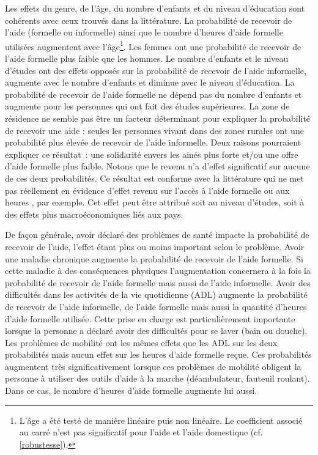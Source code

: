 \begin{Article}
\begin{refsection}[Bonnal]
Les effets du genre, de l'âge, du nombre d'enfants et du niveau d'éducation sont cohérents avec ceux trouvés dans la littérature. La probabilité de recevoir de l'aide (formelle ou informelle) ainsi que le nombre d'heures d'aide formelle utilisées augmentent avec l'âge\footnote{L’âge a été testé de manière linéaire puis non linéaire. Le coefficient associé au carré n’est pas significatif pour l'aide et l'aide domestique (cf. \autoref{robustesse}).}. Les femmes ont une probabilité de recevoir de l'aide formelle plus faible que les hommes. Le nombre d'enfants et le niveau d'études ont des effets opposés sur la probabilité de recevoir de l'aide informelle, augmente avec le nombre d'enfants et diminue avec le niveau d'éducation. La probabilité de recevoir de l'aide formelle ne dépend pas du nombre d'enfants et augmente pour les personnes qui ont fait des études supérieures. La zone de résidence ne semble pas être un facteur déterminant pour expliquer la probabilité de recevoir une aide : seules les personnes vivant dans des zones rurales ont une probabilité plus élevée de recevoir de l'aide informelle. Deux raisons pourraient expliquer ce résultat~: une solidarité envers les ainés plus forte et/ou une offre d’aide formelle plus faible. Notons que le revenu n'a d'effet significatif sur aucune de ces deux probabilités. Ce résultat est conforme avec la littérature qui ne met pas réellement en évidence d’effet revenu sur l’accès à l’aide formelle ou aux heures \parencite{BALIA2014,PERDRIX2021}, par exemple. Cet effet peut être attribué soit au niveau d’études, soit à des effets plus macroéconomiques liés aux pays.

De façon générale, avoir déclaré des problèmes de santé impacte la probabilité de recevoir de l'aide, l'effet étant plus ou moins important selon le problème. Avoir une maladie chronique augmente la probabilité de recevoir de l'aide formelle. Si cette maladie à des conséquences physiques l'augmentation concernera à la fois la probabilité de recevoir de l'aide formelle mais aussi de l'aide informelle. Avoir des difficultés dans les activités de la vie quotidienne (ADL) augmente la probabilité de recevoir de l'aide informelle, de l'aide formelle mais aussi la quantité d'heures d'aide formelle utilisée. Cette prise en charge est particulièrement importante lorsque la personne a déclaré avoir des difficultés pour se laver (bain ou douche). Les problèmes de mobilité ont les mêmes effets que les ADL sur les deux probabilités mais aucun effet sur les heures d'aide formelle reçue. Ces probabilités augmentent très significativement lorsque ces problèmes de mobilité obligent la personne à utiliser des outils d'aide à la marche (déambulateur, fauteuil roulant). Dans ce cas, le nombre d'heures d'aide formelle augmente lui aussi.


\end{refsection}
\end{Article}
